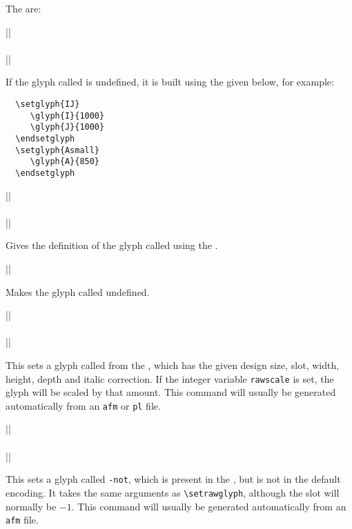 \documentclass[a4paper]{ltxguide}
\newcommand*{\setfilename}[1]{\texttt{#1}}
\newcommand{\pl} {\setfilename{pl}\xspace}
\newcommand{\afm}{\setfilename{afm}\xspace}
\begin{document}
The  are:

\begin{decl}
  |\setglyph|\\
   \\
  |\endsetglyph|
\end{decl}
If the glyph called  is undefined, it is built using the
 given below, for example:
\begin{verbatim}
  \setglyph{IJ}
     \glyph{I}{1000}
     \glyph{J}{1000}
  \endsetglyph
  \setglyph{Asmall}
     \glyph{A}{850}
  \endsetglyph
\end{verbatim}

\begin{decl}
  |\resetglyph|\\
  \\
  |\endsetglyph|
\end{decl}
Gives the definition of the glyph called  using the
.

\begin{decl}
  |\unsetglyph|
\end{decl}
Makes the glyph called  undefined.

\begin{decl}
  |\setrawglyph|\\
    \\
  |\setscaledrawglyph|\\
\end{decl}
This sets a glyph called  from the , which has the
given design size, slot, width, height, depth and italic correction.
If the integer variable \texttt{rawscale} is set, the glyph will be
scaled by that amount.  This command will usually be generated
automatically from an \afm or \pl file.

\begin{decl}
  |\setnotglyph|\\
    \\
  |\setscalednotglyph|\\
\end{decl}
This sets a glyph called \texttt{-not}, which is present in
the , but is not in the default encoding.  It takes the same
arguments as \verb|\setrawglyph|, although the slot will normally be
$-1$.  This command will usually be generated automatically from an
\afm file.
\end{document}
